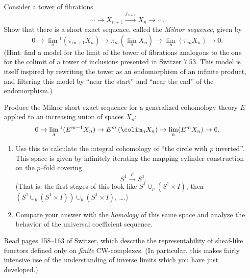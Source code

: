 \begin{problem}
Consider a tower of fibrations \[\cdots \to X_{n+1} \xrightarrow{f_{n+1}} X_n \to \cdots.\]  Show that there is a short exact sequence, called the \textit{Milnor sequence}, given by \[0 \to \lim_n{}^1 \left( \pi_{m+1} X_n \right) \to \pi_m \left( \lim_n X_n \right) \to \lim_n \left( \pi_m X_n \right) \to 0.\]  (Hint: find a model for the limit of the tower of fibrations analogous to the one for the colimit of a tower of inclusions presented in Switzer 7.53.  This model is itself inspired by rewriting the tower as an endomorphism of an infinite product, and filtering this model by ``near the start'' and ``near the end'' of the endomorphism.)
\end{problem}

\begin{problem}
Produce the Milnor short exact sequence for a generalized cohomology theory $E$ applied to an increasing union of spaces $X_n$: \[0 \to \lim_n{}^1 (E^{m-1} X_n) \to E^m \left(\colim_n X_n\right) \to \lim_n (E^m X_n) \to 0.\]
\end{problem}

\begin{problem}
\begin{enumerate}
    \item Use this to calculate the integral cohomology of ``the circle with $p$ inverted''.  This space is given by infinitely iterating the mapping cylinder construction on the $p$--fold covering \[S^1 \xrightarrow{p} S^1.\]  (That is: the first stages of this look like $S^1 \cup_p (S^1 \times I)$, then $(S^1 \cup_p (S^1 \times I)) \cup_p (S^1 \times I)$, \ldots.)
    \item Compare your answer with the \emph{homology} of this same space and analyze the behavior of the universal coefficient sequence.
\end{enumerate}
\end{problem}

\begin{task}
Read pages 158--163 of Switzer, which describe the representability of sheaf-like functors defined only on \emph{finite} CW-complexes.  (In particular, this makes fairly intensive use of the understanding of inverse limits which you have just developed.)
\end{task}

